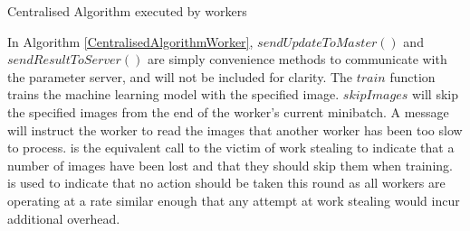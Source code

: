 \documentclass[12pt]{article}
\begin{document}
\IncMargin{1em}
\begin{algorithm}[H]
 \BlankLine
 \BlankLine
 \BlankLine
 \setcounter{AlgoLine}{0}
 \BlankLine
 \BlankLine
 \BlankLine
 \setcounter{AlgoLine}{0}
 \BlankLine
 \BlankLine
 \BlankLine
 \setcounter{AlgoLine}{0}
 \BlankLine
 \caption{Centralised Algorithm executed by workers}
 \label{CentralisedAlgorithmWorker}
\end{algorithm}
\DecMargin{1em}
\medskip

In Algorithm \ref{CentralisedAlgorithmWorker}, $sendUpdateToMaster()$ and $sendResultToServer()$ are simply convenience methods to communicate with the parameter server, and will not be included for clarity. The $train$ function trains the machine learning model with the specified image. $skipImages$ will skip the specified images from the end of the worker's current minibatch. A  message will instruct the worker to read the images that another worker has been too slow to process.  is the equivalent call to the victim of work stealing to indicate that a number of images have been lost and that they should skip them when training.  is used to indicate that no action should be taken this round as all workers are operating at a rate similar enough that any attempt at work stealing would incur additional overhead.
\end{document}
